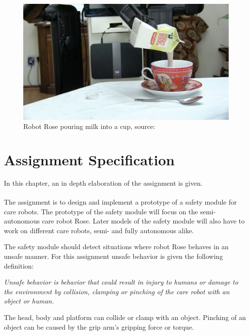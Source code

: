 \documentclass[12pt]{scrreprt}
\begin{document}
\begin{figure}[H]
    \centering
    \includegraphics[width=\textwidth]{Figures/pouring_milk_into_a_cup.jpg}
    \caption{Robot Rose pouring milk into a cup, source: \cite{rose_specification}}
    \label{fig:rose_milking}
\end{figure}

\chapter{Assignment Specification}

\label{Assignment specification}

In this chapter, an in depth elaboration of the assignment is given.
\\\\
The assignment is to design and implement a prototype of a safety module for care robots. The prototype of the safety module will focus on the semi-autonomous care robot Rose. Later models of the safety module will also have to work on different care robots, semi- and fully autonomous alike.
\par
The safety module should detect situations where robot Rose behaves in an unsafe manner. For this assignment unsafe behavior is given the following definition:
\begin{flushleft}
\textit{
Unsafe behavior is behavior that could result in injury to humans or damage to the environment by collision, clamping or pinching of the care robot with an object or human.
}
\end{flushleft}
The head, body and platform can collide or clamp with an object. Pinching of an object can be caused by the grip arm's gripping force or torque. %
 
\end{document}
